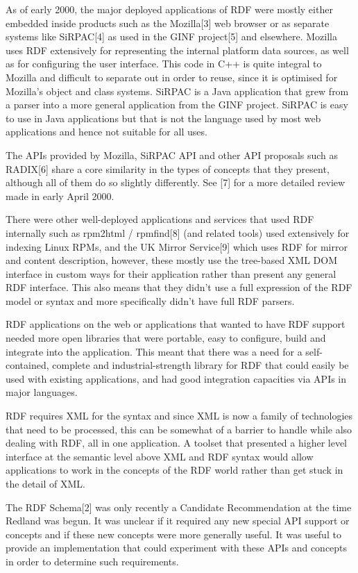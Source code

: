 \documentclass[11pt]{article}
\begin{document}
    As of early 2000, the major deployed applications of RDF were mostly either embedded inside products such as the Mozilla[3] web browser or as separate systems like SiRPAC[4] as used in the GINF project[5] and elsewhere. Mozilla uses RDF extensively for representing the internal platform data sources, as well as for configuring the user interface. This code in C++ is quite integral to Mozilla and difficult to separate out in order to reuse, since it is optimised for Mozilla's object and class systems. SiRPAC is a Java application that grew from a parser into a more general application from the GINF project. SiRPAC is easy to use in Java applications but that is not the language used by most web applications and hence not suitable for all uses.

    The APIs provided by Mozilla, SiRPAC API and other API proposals such as RADIX[6] share a core similarity in the types of concepts that they present, although all of them do so slightly differently. See [7] for a more detailed review made in early April 2000.

    There were other well-deployed applications and services that used RDF internally such as rpm2html / rpmfind[8] (and related tools) used extensively for indexing Linux RPMs, and the UK Mirror Service[9] which uses RDF for mirror and content description, however, these mostly use the tree-based XML DOM interface in custom ways for their application rather than present any general RDF interface. This also means that they didn't use a full expression of the RDF model or syntax and more specifically didn't have full RDF parsers.

    RDF applications on the web or applications that wanted to have RDF support needed more open libraries that were portable, easy to configure, build and integrate into the application. This meant that there was a need for a self-contained, complete and industrial-strength library for RDF that could easily be used with existing applications, and had good integration capacities via APIs in major languages.

    RDF requires XML for the syntax and since XML is now a family of technologies that need to be processed, this can be somewhat of a barrier to handle while also dealing with RDF, all in one application. A toolset that presented a higher level interface at the semantic level above XML and RDF syntax would allow applications to work in the concepts of the RDF world rather than get stuck in the detail of XML.

    The RDF Schema[2] was only recently a Candidate Recommendation at the time Redland was begun. It was unclear if it required any new special API support or concepts and if these new concepts were more generally useful. It was useful to provide an implementation that could experiment with these APIs and concepts in order to determine such requirements.
\end{document}
